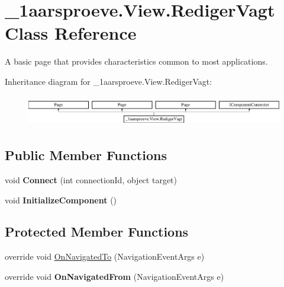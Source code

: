 \hypertarget{class__1aarsproeve_1_1_view_1_1_rediger_vagt}{}\section{\+\_\+1aarsproeve.\+View.\+Rediger\+Vagt Class Reference}
\label{class__1aarsproeve_1_1_view_1_1_rediger_vagt}


A basic page that provides characteristics common to most applications.  


Inheritance diagram for \+\_\+1aarsproeve.\+View.\+Rediger\+Vagt\+:\begin{figure}[H]
\begin{center}
\leavevmode
\includegraphics[height=1.365854cm]{class__1aarsproeve_1_1_view_1_1_rediger_vagt}
\end{center}
\end{figure}
\subsection*{Public Member Functions}
\begin{DoxyCompactItemize}
\item 
\hypertarget{class__1aarsproeve_1_1_view_1_1_rediger_vagt_aadd8614ddc572e62fe046f7fa5a3897a}{}void {\bfseries Connect} (int connection\+Id, object target)\label{class__1aarsproeve_1_1_view_1_1_rediger_vagt_aadd8614ddc572e62fe046f7fa5a3897a}

\item 
\hypertarget{class__1aarsproeve_1_1_view_1_1_rediger_vagt_aa6fd55b8255bfb967ce2eb82b6f4c68d}{}void {\bfseries Initialize\+Component} ()\label{class__1aarsproeve_1_1_view_1_1_rediger_vagt_aa6fd55b8255bfb967ce2eb82b6f4c68d}

\end{DoxyCompactItemize}
\subsection*{Protected Member Functions}
\begin{DoxyCompactItemize}
\item 
override void \hyperlink{class__1aarsproeve_1_1_view_1_1_rediger_vagt_adccbdc0bca2c6ca8429f8510816a0701}{On\+Navigated\+To} (Navigation\+Event\+Args e)
\item 
\hypertarget{class__1aarsproeve_1_1_view_1_1_rediger_vagt_a1d27c2a52dfaca570b513aba86b023a2}{}override void {\bfseries On\+Navigated\+From} (Navigation\+Event\+Args e)\label{class__1aarsproeve_1_1_view_1_1_rediger_vagt_a1d27c2a52dfaca570b513aba86b023a2}

\end{DoxyCompactItemize}
